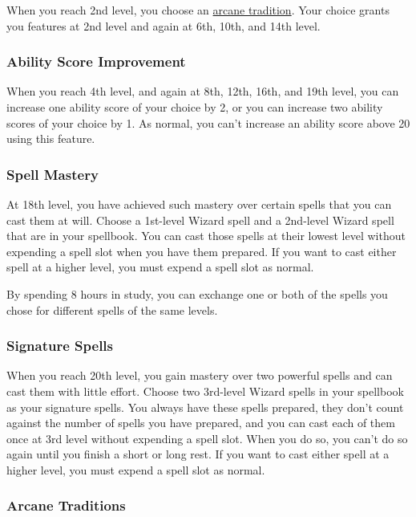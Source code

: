 When you reach 2nd level, you choose an
\hyperref[wizard-subclasses]{arcane tradition}. Your choice grants you
features at 2nd level and again at 6th, 10th, and 14th level.

\subsubsection{Ability Score Improvement}\label{wizard-feature-asi}

When you reach 4th level, and again at 8th, 12th, 16th, and 19th level,
you can increase one ability score of your choice by 2, or you can
increase two ability scores of your choice by 1. As normal, you can't
increase an ability score above 20 using this feature.

\subsubsection{Spell Mastery}\label{wizard-feature-spell-mastery}

At 18th level, you have achieved such mastery over certain spells that
you can cast them at will. Choose a 1st-level Wizard spell and a
2nd-level Wizard spell that are in your spellbook. You can cast those
spells at their lowest level without expending a spell slot when you
have them prepared. If you want to cast either spell at a higher level,
you must expend a spell slot as normal.

By spending 8 hours in study, you can exchange one or both of the spells
you chose for different spells of the same levels.

\subsubsection{Signature Spells}\label{wizard-feature-signature-spells}

When you reach 20th level, you gain mastery over two powerful spells and
can cast them with little effort. Choose two 3rd-level Wizard spells in
your spellbook as your signature spells. You always have these spells
prepared, they don't count against the number of spells you have
prepared, and you can cast each of them once at 3rd level without
expending a spell slot. When you do so, you can't do so again until you
finish a short or long rest. If you want to cast either spell at a
higher level, you must expend a spell slot as normal.

\subsubsection{Arcane Traditions}\label{wizard-subclasses}

